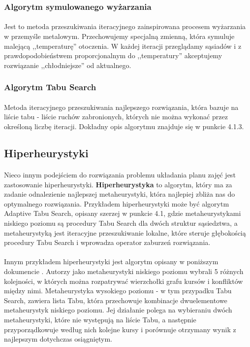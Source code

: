 \subsubsection{Algorytm symulowanego wyżarzania}
\paragraph{} Jest to metoda przeszukiwania iteracyjnego zainspirowana procesem wyżarzania w przemyśle metalowym. Przechowujemy specjalną zmienną, która symuluje malejącą ,,temperaturę'' otoczenia. W każdej iteracji przeglądamy sąsiadów i z prawdopodobieństwem proporcjonalnym do ,,temperatury'' akceptujemy rozwiązanie ,,chłodniejsze'' od aktualnego.

\subsubsection{Algorytm Tabu Search}
\paragraph{} Metoda iteracyjnego przeszukiwania najlepszego rozwiązania, która bazuje na liście tabu - liście ruchów zabronionych, których nie można wykonać przez określoną liczbę iteracji. Dokładny opis algorytmu znajduje się w punkcie 4.1.3.

\subsection{Hiperheurystyki}
\paragraph{}Nieco innym podejściem do rozwiązania problemu układania planu zajęć jest zastosowanie hiperheurystyki. \textbf{Hiperheurystyka} to algorytm, który ma za zadanie odnalezienie najlepszej metaheurystyki, która najlepiej zbliża nas do optymalnego rozwiązania. Przykładem hiperheurystyki może być algorytm Adaptive Tabu Search, opisany szerzej w punkcie 4.1, gdzie metaheurystykami niskiego poziomu są procedury Tabu Search dla dwóch struktur sąsiedztwa, a metaheurystyką jest iteracyjne przeszukiwanie lokalne, które steruje głębokością procedury Tabu Search i wprowadza operator zaburzeń rozwiązania.
\paragraph{}Innym przykładem hiperheurystyki jest algorytm opisany w poniższym dokumencie \cite{gbhh}. Autorzy jako metaheurystyki niskiego poziomu wybrali 5 różnych kolejności, w których można rozpatrywać wierzchołki grafu kursów i konfliktów między nimi. Metaheurystyka wysokiego poziomu - w tym przypadku Tabu Search, zawiera lista Tabu, która przechowuje kombinacje dwuelementowe metaheurystyk niskiego poziomu. Jej działanie polega na wybieraniu dwóch metaheurystyki, które nie występują na liście Tabu, a następnie przyporządkowuje według nich kolejne kursy i porównuje otrzymany wynik z najlepszym dotychczas osiągniętym.

